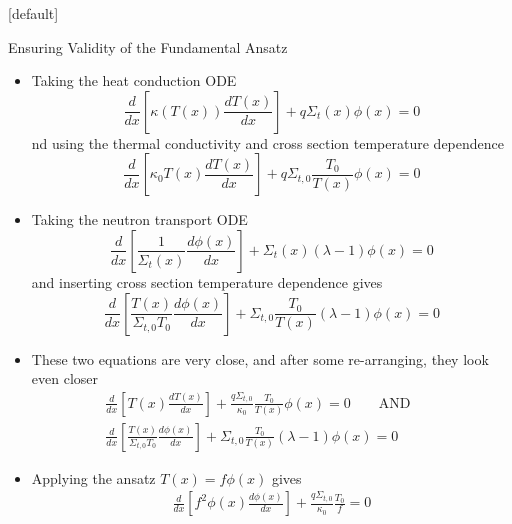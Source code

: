 \documentclass[9pt,t]{beamer}
\makeatletter
\newcommand{\QAND}{\qquad \text{AND} \qquad}
\newenvironment{withoutheadline}{
       \setbeamertemplate{headline}[default]
       \def\beamer@entrycode{\vspace*{-\headheight}}
    }{}
\makeatother
\begin{document}
\begin{withoutheadline}
    \begin{frame}[allowframebreaks]{Ensuring Validity of the Fundamental Ansatz}
        \begin{itemize}
            \item Taking the heat conduction ODE
            \begin{equation}
                \frac{d}{dx}\left\lbrack\kappa(T(x))\frac{dT(x)}{dx}\right\rbrack + q \Sigma_{t}(x)\phi(x) = 0
            \end{equation}
            nd using the thermal conductivity and cross section temperature dependence
            \begin{equation}
                \frac{d}{dx}\left\lbrack\kappa_{0} T(x)\frac{dT(x)}{dx}\right\rbrack + q\Sigma_{t,0}\frac{T_{0}}{T(x)}\phi(x) = 0
            \end{equation}
            \item Taking the neutron transport ODE
            \begin{equation}
                \frac{d}{dx}\left\lbrack\frac{1}{\Sigma_{t}(x)} \frac{d\phi(x)}{dx} \right\rbrack + \Sigma_{t}(x)
                \left(\lambda - 1\right)\phi(x) = 0
            \end{equation}
            and inserting cross section temperature dependence gives
            \begin{equation}
                \frac{d}{dx}\left\lbrack  \frac{T(x)}{\Sigma_{t,0}T_{0}} \frac{d\phi(x)}{dx} \right\rbrack + \Sigma_{t,0}\frac{T_{0}}{T(x)}
                \left(\lambda - 1\right)\phi(x) = 0
            \end{equation}
            \item These two equations are very close, and after some re-arranging, they look even closer
            \begin{multline}
                \frac{d}{dx}\left\lbrack T(x)\frac{dT(x)}{dx}\right\rbrack + \frac{q\Sigma_{t,0}}{\kappa_{0}}\frac{T_{0}}{T(x)}\phi(x) = 0
                \QAND \\
                \frac{d}{dx}\left\lbrack  \frac{T(x)}{\Sigma_{t,0}T_{0}} \frac{d\phi(x)}{dx} \right\rbrack + \Sigma_{t,0}\frac{T_{0}}{T(x)}
                \left(\lambda - 1\right)\phi(x) = 0
            \end{multline}
            \item Applying the ansatz $T(x) = f\phi(x)$ gives
            \begin{multline}
                \frac{d}{dx}\left\lbrack f^2\phi(x)\frac{d\phi(x)}{dx}\right\rbrack + \frac{q\Sigma_{t,0}}{\kappa_{0}}\frac{T_{0}}{f} = 0

\end{multline}
\end{itemize}
\end{frame}
\end{withoutheadline}
\end{document}
